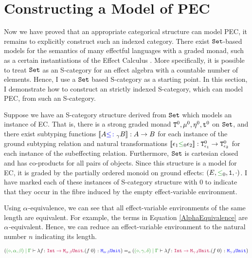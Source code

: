 
\chapter{Constructing a Model of PEC}
\label{HowToBuildAModel}

Now we have proved that an appropriate categorical structure can model PEC, it remains to explicitly construct such an indexed category. There exist $\texttt{Set}$-based models for the semantics of many effectful languages with a graded monad, such as a certain instantiations of the Effect Calculus \cite{Katsumata:2014}. More specifically, it is possible to treat $\texttt{Set}$ as an S-category for an effect algebra with a countable number of elements. Hence, I use a $\texttt{Set}$ based S-category as a starting point. In this section, I  demonstrate how to construct an strictly indexed S-category, which can model PEC, from such an S-category.

Suppose we have an S-category structure derived from $\texttt{Set}$ which models an instance of EC. That is, there is a strong graded monad $\texttt{T}^0_{}, \mu^0, \eta_{}^0, \texttt{t}^0$ on $\texttt{Set}$, and there exist subtyping functions ${\bf [\![}A{\color{blue} \leq\colon}_\gamma B{\bf ]\!]}: A \rightarrow B$ for each instance of the ground subtyping relation and natural transformations $\deno{\e_1 \subeffectz \e_2}: \Tz{\e_1}{} \rightarrow \Tz{\e_2}{}$ for each instance of the subeffecting relation. Furthermore, $\texttt{Set}$ is cartesian closed and has co-products for all pairs of objects. Since this structure is a model for EC, it is graded by the partially ordered monoid on ground effects: $(E, \subeffectz, \1, \dot)$. I have marked each of these instances of S-category structure with $0$ to indicate that they occur in the fibre induced by the empty effect-variable environment.

Using $\alpha$-equivalence, we can see that all effect-variable environments of the same length are equivalent. For example, the terms in Equation \ref{AlphaEquivalence} are $\alpha$-equivalent. Hence, we can reduce an effect-variable environment to the natural number $n$ indicating its length.

\begin{equation}\label{AlphaEquivalence}
    \scalebox{.8}{$
    (\etyperelation{(\nil, \a, \b)}{\G}{\lam{f}{\fntype{\texttt{Int}}{\M{\a\dot\b}{\U}}}{(\apply{f}{0})}}{\M{\a\dot\b}{\U}})  =_\a(\etyperelation{(\nil, \g, \d)}{\G}{\lam{f}{\fntype{\texttt{Int}}{\M{\g\dot\d}{\U}}}{(\apply{f}{0})}}{\M{\g\dot\d}{\U}})
    $}
\end{equation}
 
